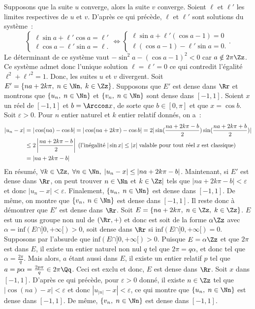 {\begin{enumerate}
{Supposons que la suite $u$ converge, alors la suite $v$ converge. Soient $\ell$ et $\ell'$ les limites respectives de $u$ et $v$. D'après ce qui précède, $\ell$ et $\ell'$ sont solutions du système~: 
$$\left\{
\begin{array}{l}
\ell\sin a+\ell'\cos a=\ell'\\
\ell\cos a-\ell'\sin a=\ell.
\end{array}
\right.\Leftrightarrow\left\{
\begin{array}{l}
\ell\sin a+\ell'(\cos a-1)=0\\
\ell(\cos a-1)-\ell'\sin a=0.
\end{array}
\right..$$
Le déterminant de ce système vaut $-\sin^2a-(\cos a-1)^2<0$ car $a\notin2\pi\Zz$. Ce système admet donc l'unique solution $\ell=\ell'=0$ ce qui contredit l'égalité $\ell^2+{\ell'}^2=1$. Donc, les suites $u$ et $v$ divergent.
Soit $E'=\{na+2k\pi,\;n\in\Nn,\;k\in\Zz\}$. Supposons que $E'$ est dense dans $\Rr$ et montrons que $\{u_n,\;n\in\Nn\}$ et $\{v_n,\;n\in\Nn\}$ sont dense dans $[-1,1]$.
Soient $x$ un réel de $[-1,1]$ et $b=\Arccos x$, de sorte que $b\in[0,\pi]$ et que $x=\cos b$.
Soit $\varepsilon>0$. Pour $n$ entier naturel et $k$ entier relatif donnés, on a~:
\begin{align*}\ensuremath
|u_n-x|&=|\cos(na)-\cos b|=|\cos(na+2k\pi)-\cos b|=2|\sin(\frac{na+2k\pi-b}{2})\sin(\frac{na+2k\pi+b}{2})|\\
 &\leq2\left|\frac{na+2k\pi-b}{2}\right|\;(\mbox{l'inégalité}\;|\sin x|\leq|x|\;\mbox{valable pour tout réel}\;x\;\mbox{est classique})\\
 &=|na+2k\pi-b|
\end{align*}
En résumé, $\forall k\in\Zz,\;\forall n\in\Nn,\;|u_n-x|\leq|na+2k\pi-b|$. Maintenant, si $E'$ est dense dans $\Rr$, on peut trouver $n\in\Nn$ et $k\in\Zz|$ tels que $|na+2k\pi-b|<\varepsilon$ et donc $|u_n-x|<\varepsilon$.
Finalement, $\{u_n,\;n\in\Nn\}$ est dense dans $[-1,1]$. De même, on montre que $\{v_n,\;n\in\Nn\}$ est dense dans $[-1,1]$.
Il reste donc à démontrer que $E'$ est dense dans $\Rr$.
Soit $E=\{na+2k\pi,\;n\in\Zz,\;k\in\Zz\}$. $E$ est un sous groupe non nul de $(\Rr,+)$ et donc est soit de la forme $\alpha\Zz$ avec $\alpha=\mbox{inf}(E\cap]0,+\infty[)>0$, soit dense dans $\Rr$ si $\mbox{inf}(E\cap]0,+\infty[)=0$.
Supposons par l'absurde que $\mbox{inf}(E\cap]0,+\infty[)>0$. Puisque $E=\alpha\Zz$ et que $2\pi$ est dans $E$, il existe un entier naturel non nul $q$ tel que $2\pi=q\alpha$, et donc tel que $\alpha=\frac{2\pi}{q}$.
Mais alors, $a$ étant aussi dans $E$, il existe un entier relatif $p$ tel que $a=p\alpha=\frac{2p\pi}{q}\in2\pi\Qq$. Ceci est exclu et donc, $E$ est dense dans $\Rr$.
Soit $x$ dans $[-1,1]$. D'après ce qui précède, pour $\varepsilon>0$ donné, il existe $n\in\Zz$ tel que $|\cos(na)-x|<\varepsilon$ et donc $|u_{|n|}-x|<\varepsilon$, ce qui montre que $\{u_n,\;n\in\Nn\}$ est dense dans $[-1,1]$. De même, $\{v_n,\;n\in\Nn\}$ est dense dans $[-1,1]$.
}
\end{enumerate}
}

